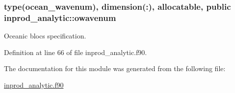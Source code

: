 \hypertarget{classinprod__analytic_a7273713c6b1a079e1c653e8b8d2fe089}{
\subsubsection[{owavenum}]{\setlength{\rightskip}{0pt plus 5cm}type({\bf ocean\-\_\-wavenum}), dimension(\-:), allocatable, public inprod\-\_\-analytic\-::owavenum}}\label{classinprod__analytic_a7273713c6b1a079e1c653e8b8d2fe089}


Oceanic blocs specification. 



Definition at line 66 of file inprod\-\_\-analytic.\-f90.



The documentation for this module was generated from the following file\-:\begin{DoxyCompactItemize}
\item 
\hyperlink{inprod__analytic_8f90}{inprod\-\_\-analytic.\-f90}\end{DoxyCompactItemize}
